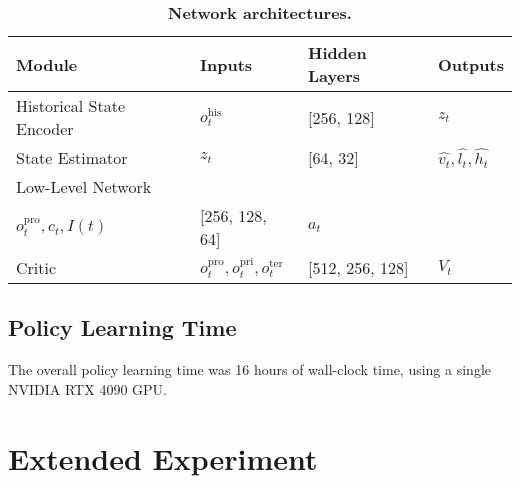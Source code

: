 \begin{table}[t]
\setlength{\abovecaptionskip}{0.cm}
\setlength{\belowcaptionskip}{-0.cm}
    \centering
    \caption{\small \textbf{Network architectures.}} 
    \label{tab:network architecture}
\begin{tabular}{llll}
\hline
Module                   & Inputs                                                                                                  & Hidden Layers       & Outputs                           \\ \hline
Historical State Encoder & $o_t^{\text{his}}$                                                                                             & {[}256, 128{]}      & $z_t$                             \\
State Estimator          & $z_t$                                                                                                   & {[}64, 32{]}        & $\hat{v_t}, \hat{l_t}, \hat{h_t}$ \\
Low-Level Network        & \makecell[l]{$z_t, \hat{v_t}, \hat{l_t}, \hat{h_t}$, \\ $o_t^{\text{pro}}, c_t, I(t)$} & {[}256, 128, 64{]}  & $a_t$                             \\
Critic                  & $o_t^{\text{pro}},o_t^{\text{pri}},o_t^{\text{ter}}$                                                                         & {[}512, 256, 128{]} & $V_t$                             \\ \hline
\end{tabular}
\end{table}

\subsection{Policy Learning Time}
The overall policy learning time was 16 hours of wall-clock time, using a single NVIDIA RTX 4090 GPU.

\section{Extended Experiment}
